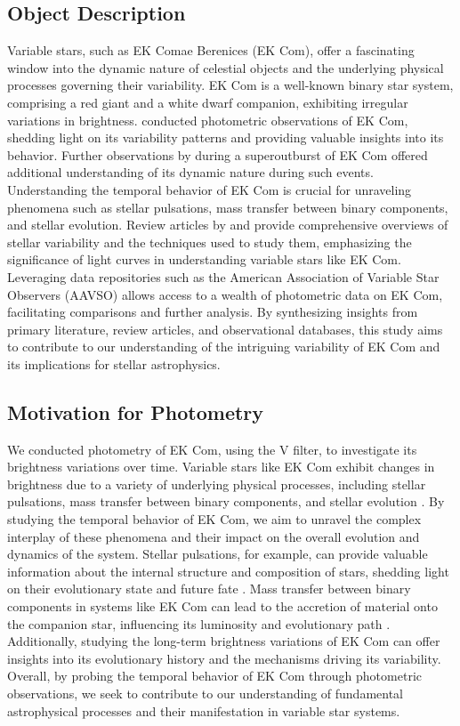 \documentclass[]{aastex63}
\begin{document}
\subsection{Object Description}
Variable stars, such as EK Comae Berenices (EK Com), offer a fascinating window into the dynamic nature of celestial objects and the underlying physical processes governing their variability. EK Com is a well-known binary star system, comprising a red giant and a white dwarf companion, exhibiting irregular variations in brightness. \cite{templeton2005} conducted photometric observations of EK Com, shedding light on its variability patterns and providing valuable insights into its behavior. Further observations by \cite{price2007} during a superoutburst of EK Com offered additional understanding of its dynamic nature during such events. Understanding the temporal behavior of EK Com is crucial for unraveling phenomena such as stellar pulsations, mass transfer between binary components, and stellar evolution. Review articles by \cite{smith2010} and \cite{percy2017} provide comprehensive overviews of stellar variability and the techniques used to study them, emphasizing the significance of light curves in understanding variable stars like EK Com. Leveraging data repositories such as the American Association of Variable Star Observers (AAVSO) allows access to a wealth of photometric data on EK Com, facilitating comparisons and further analysis. By synthesizing insights from primary literature, review articles, and observational databases, this study aims to contribute to our understanding of the intriguing variability of EK Com and its implications for stellar astrophysics.


\subsection{Motivation for Photometry}
We conducted photometry of EK Com, using the V filter, to investigate its brightness variations over time. Variable stars like EK Com exhibit changes in brightness due to a variety of underlying physical processes, including stellar pulsations, mass transfer between binary components, and stellar evolution \citep{templeton2005, smith2010, percy2017}. By studying the temporal behavior of EK Com, we aim to unravel the complex interplay of these phenomena and their impact on the overall evolution and dynamics of the system. Stellar pulsations, for example, can provide valuable information about the internal structure and composition of stars, shedding light on their evolutionary state and future fate \citep{smith2010}. Mass transfer between binary components in systems like EK Com can lead to the accretion of material onto the companion star, influencing its luminosity and evolutionary path \citep{price2007}. Additionally, studying the long-term brightness variations of EK Com can offer insights into its evolutionary history and the mechanisms driving its variability. Overall, by probing the temporal behavior of EK Com through photometric observations, we seek to contribute to our understanding of fundamental astrophysical processes and their manifestation in variable star systems.
\end{document}
